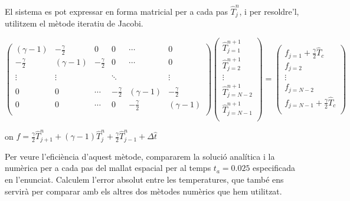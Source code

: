 \documentclass[11pt]{article}
\begin{document}
El sistema es pot expressar en forma matricial per a cada pas $\hat{T}_j^n$, i per resoldre'l, utilitzem el mètode iteratiu de Jacobi.

\begin{equation}
  \begin{pmatrix}
    (\gamma - {1}) & {-}\frac{\gamma}{2} & {0} & {0} & \cdots & {0} \\
    {-}\frac{\gamma}{2} & (\gamma - {1}) & {-}\frac{\gamma}{2} & {0} & \cdots & {0} \\
    & \\
    \vdots & \vdots & & \ddots & & \vdots \\
    & \\
    {0} & {0} & \cdots & {-}\frac{\gamma}{2} & (\gamma - {1}) & {-}\frac{\gamma}{2} \\
    {0} & {0} & \cdots & {0} & {-}\frac{\gamma}{2} & (\gamma - {1}) \\
    \end{pmatrix}
    \begin{pmatrix}
        \hat{T}_{j=1}^{n+1} \\
        \hat{T}_{j=2}^{n+1} \\
        \vdots \\
        \hat{T}_{j=N-2}^{n+1} \\
        \hat{T}_{j=N-1}^{n+1} \\
    \end{pmatrix}
    =
    \begin{pmatrix}
        f_{j=1} +\frac{\gamma}{2}\hat{T}_{c} \\
        f_{j=2} \\
        \vdots \\
        f_{j=N-2} \\
        f_{j=N-1} +\frac{\gamma}{2}\hat{T}_{c} \\
    \end{pmatrix}
\end{equation}

\begin{center}
on $f = \frac{\gamma}{2}\hat{T}_{j+1}^{n} + (\gamma - {1})\hat{T}_{j}^{n} + \frac{\gamma}{2}\hat{T}_{j-1}^{n} + \Delta\hat{t}$
\end{center}

Per veure l'eficiència d'aquest mètode, compararem la solució analítica i la numèrica per a cada pas del 
mallat espacial per al temps $t_a = 0.025$ especificada en l'enunciat. Calculem l'error absolut entre les 
temperatures, que també ens servirà per comparar amb els altres dos mètodes numèrics que hem utilitzat.
\end{document}
